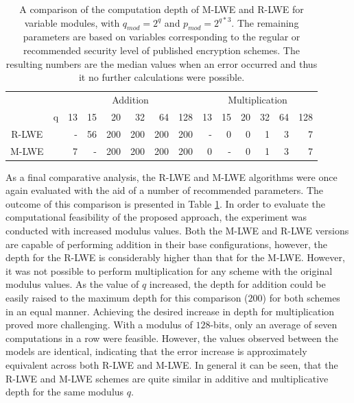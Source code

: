 \begin{table}[h]
  \centering
  \caption[M-LWE and R-LWE computation depth comparison]{A comparison of the computation depth of M-LWE and R-LWE for variable modules, with $q_{mod} = 2^q$ and $p_{mod}=2^{q*3}$. The remaining parameters are based on variables corresponding to the regular or recommended security level of published encryption schemes. The resulting numbers are the median values when an error occurred and thus it no further calculations were possible.}
  
  \begin{tabular}{|cc|rrrrrr|rrrrrr|}
    \toprule
                                       &   & \multicolumn{6}{|c|}{Addition} & \multicolumn{6}{|c|}{Multiplication}                                                        \\
                                       & q & 13                             & 15                                   & 20  & 32  & 64  & 128 & 13 & 15 & 20 & 32 & 64 & 128 \\
    \midrule
    R-LWE  \cite{CyrstalsKyber}        &   & -                              & 56                                   & 200 & 200 & 200 & 200 & -  & 0  & 0  & 1  & 3  & 7   \\
    M-LWE  \cite{PracticalKeyExchange} &   & 7                              & -                                    & 200 & 200 & 200 & 200 & 0  & -  & 0  & 1  & 3  & 7   \\
    \bottomrule
  \end{tabular}
  \label{table:depthComparison}
\end{table}

As a final comparative analysis, the R-LWE and M-LWE algorithms were once again evaluated with the aid of a number of recommended parameters. The outcome of this comparison is presented in Table \ref{table:depthComparison}. In order to evaluate the computational feasibility of the proposed approach, the experiment was conducted with increased modulus values. Both the M-LWE and R-LWE versions are capable of performing addition in their base configurations, however, the depth for the R-LWE is considerably higher than that for the M-LWE. However, it was not possible to perform multiplication for any scheme with the original modulus values. As the value of $q$ increased, the depth for addition could be easily raised to the maximum depth for this comparison ($200$) for both schemes in an equal manner. Achieving the desired increase in depth for multiplication proved more challenging. With a modulus of $128$-bits, only an average of seven computations in a row were feasible. However, the values observed between the models are identical, indicating that the error increase is approximately equivalent across both R-LWE and M-LWE. In general it can be seen, that the R-LWE and M-LWE schemes are quite similar in additive and multiplicative depth for the same modulus $q$.

